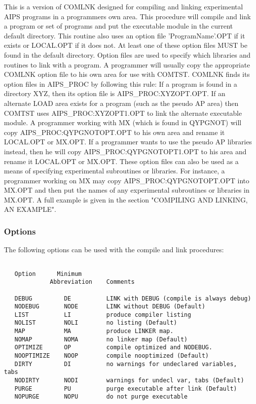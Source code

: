 This is a version of COMLNK designed for compiling and linking
experimental AIPS programs in
a programmers own area.  This
procedure will compile and link a program or set of programs and
put the executable module in the current default directory.  This routine
also uses an option file 'ProgramName'.OPT if it exists or LOCAL.OPT if
it does not.  At least one of these option files
MUST be found in the default
directory.  Option files are used to specify which libraries and routines
to link with a program.    A programmer will usually
copy the appropriate COMLNK option file to his own area for use with
COMTST.  COMLNK finds its option files in
AIPS\_PROC by following this rule:  If a program is found in a directory
XYZ, then its option file is AIPS\_PROC:XYZOPT.OPT.  If an alternate
LOAD area exists for a program (such as the pseudo AP area) then COMTST
uses AIPS\_PROC:XYZOPT1.OPT to link the alternate executable module.
A programmer working with MX (which is found in QYPGNOT) will
copy AIPS\_PROC:QYPGNOTOPT.OPT to his own area and rename it LOCAL.OPT or
MX.OPT.  If a programmer wants to use the pseudo AP libraries instead,
then he will copy AIPS\_PROC:QYPGNOTOPT1.OPT to his area and rename it
LOCAL.OPT or MX.OPT.  These option files can also be used as a means of
specifying experimental subroutines or libraries.  For instance, a
programmer working on MX may copy AIPS\_PROC:QYPGNOTOPT.OPT into MX.OPT
and then put the names of any experimental subroutines or libraries in MX.OPT.
A full example is given in the section "COMPILING AND LINKING, AN EXAMPLE".

\subsubsection{ Options }
The following options can be used with the compile and link procedures:
\begin{verbatim}

   Option      Minimum
             Abbreviation    Comments

   DEBUG         DE          LINK with DEBUG (compile is always debug)
   NODEBUG       NODE        LINK without DEBUG (Default)
   LIST          LI          produce compiler listing
   NOLIST        NOLI        no listing (Default)
   MAP           MA          produce LINKER map.
   NOMAP         NOMA        no linker map (Default)
   OPTIMIZE      OP          compile optimized and NODEBUG.
   NOOPTIMIZE    NOOP        compile nooptimized (Default)
   DIRTY         DI          no warnings for undeclared variables, tabs
   NODIRTY       NODI        warnings for undecl var, tabs (Default)
   PURGE         PU          purge executable after link (Default)
   NOPURGE       NOPU        do not purge executable

\end{verbatim}

